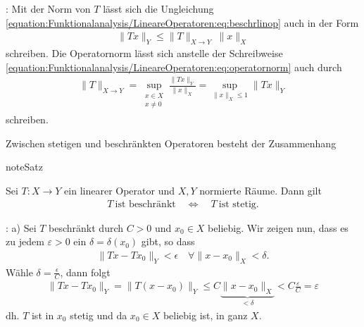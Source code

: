 \documentclass[letterpaper,10pt,english]{jupyterBook}
\begin{document}
: Mit der Norm von \(T\) lässt sich die Ungleichung \eqref{equation:Funktionalanalysis/LineareOperatoren:eq:beschrlinop} auch in der Form
\begin{equation*}
\begin{split}\|T x\|_Y \le \|T\|_{X\to Y}\ \|x\|_X\end{split}
\end{equation*}
schreiben. Die Operatornorm lässt sich anstelle der Schreibweise \eqref{equation:Funktionalanalysis/LineareOperatoren:eq:operatornorm} auch durch
\begin{equation*}
\begin{split}\|T\|_{X\to Y} = \sup_{\substack{x\in X\\x\not= 0}} \frac{\|T x\|_Y}{\|x\|_X} = \sup_{\|x\|_X \le 1} \|T x\|_Y\end{split}
\end{equation*}
schreiben.

Zwischen stetigen und beschränkten Operatoren besteht der Zusammenhang

\begin{sphinxadmonition}{note}{Satz}

Sei \(T: X\to Y\) ein linearer Operator und \(X,Y\) normierte Räume. Dann gilt
\begin{equation*}
\begin{split}T\ \text{ist beschränkt} \quad\Leftrightarrow \quad T\ \text{ist stetig.}\end{split}
\end{equation*}\end{sphinxadmonition}

:
a) Sei \(T\) beschränkt durch \(C>0\) und \(x_0\in X\) beliebig. Wir zeigen nun, dass es zu jedem \(\varepsilon>0\) ein \(\delta=\delta(x_0)\) gibt, so dass
\begin{equation*}
\begin{split}\| T x - T x_0\|_Y < \epsilon\quad \forall \|x -x_0\|_X < \delta.\end{split}
\end{equation*}
Wähle \(\delta = \frac{\epsilon}{C}\), dann folgt
\begin{equation*}
\begin{split}\| T x - T x_0\|_Y = \|T (x-x_0)\|_Y \le C \underbrace{\|x-x_0\|_X}_{< \delta} < C \frac{\varepsilon}{C} = \varepsilon\end{split}
\end{equation*}
dh. \(T\) ist in \(x_0\) stetig und da \(x_0\in X\) beliebig ist, in ganz \(X\).
\end{document}
